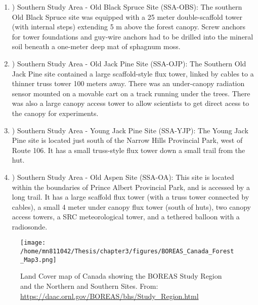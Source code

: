 \begin{enumerate}[i]
 \item) Southern Study Area - Old Black Spruce Site (SSA-OBS): The southern Old Black Spruce site was equipped with a 25 meter double-scaffold tower (with internal steps) extending 5 m above the forest canopy. Screw anchors for tower foundations and guy-wire anchors had to be drilled into the mineral soil beneath a one-meter deep mat of sphagnum moss.
 \item) Southern Study Area - Old Jack Pine Site (SSA-OJP): The Southern Old Jack Pine site contained a large scaffold-style flux tower, linked by cables to a thinner truss tower 100 meters away. There was an under-canopy radiation sensor mounted on a movable cart on a track running under the trees. There was also a large canopy access tower to allow scientists to get direct acess to the canopy for experiments. 
 \item) Southern Study Area - Young Jack Pine Site (SSA-YJP): The Young Jack Pine site is located just south of the Narrow Hills Provincial Park, west of Route 106. It has a small truss-style flux tower down a small trail from the hut.
 \item) Southern Study Area - Old Aspen Site (SSA-OA): This site is located within the boundaries of Prince Albert Provincial Park, and is accessed by a long trail. It has a large scaffold flux tower (with a truss tower connected by cables), a small 4 meter under canopy flux tower (south of huts), two canopy access towers, a SRC meteorological tower, and a tethered balloon with a radiosonde.
\end{enumerate}

\begin{figure}[ht!]
\centering
\texttt{[image: /home/mn811042/Thesis/chapter3/figures/BOREAS\_Canada\_Forest\_Map3.png]}
\caption{Land Cover map of Canada showing the BOREAS Study Region and the Northern and Southern Sites. From: \url{https://daac.ornl.gov/BOREAS/bhs/Study_Region.html}} 
\label{f:boreas_plot}
\end{figure}


